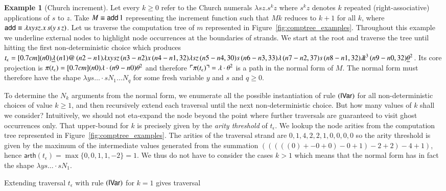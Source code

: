 \documentclass{elsarticle}
\theoremstyle{plain}
\theoremstyle{definition}
\newtheorem{example}{Example}[section]
\theoremstyle{remark}
\newcommand{\ghostlmd}{{\lambda\!\!\lambda}}
\newcommand{\ghostvar}{\theta}
\def\coresymbol{\pi} %
\newcommand{\core}[1]{\coresymbol(#1)} %
\newcommand\arth{\textsf{arth}} %
\newcommand{\alphaequiv}{\equiv}
\begin{document}
\begin{example}[Church increment]
\label{examp:churchincrement}
Let every $k\geq0$ refer to the Church numerals $\lambda s z . s^k z$
where $s^k z$ denotes $k$ repeated (right-associative) applications of $s$ to $z$.
Take $M \alphaequiv {\sf add}\, 1$ representing the increment function such that $M k$ reduces to $k+1$ for all $k$, where ${\sf add} \alphaequiv \lambda x y s z. x\, s (y\, s\, z)$.
Let us traverse the computation tree of $m$ represented in Figure~\ref{fig:comptree_examples}. Throughout this example we underline external nodes to highlight node occurrences at the boundaries of strands.
We start at the root and traverse the tree until hitting the first non-deterministic choice which produces
$t_\epsilon = \Pstr[0.7cm]{(n0){\underline\lambda }\,(n1){@}\,(n2-n1){\lambda x y s z}\,(n3-n2){x}\,(n4-n1,32){\lambda s z}\,(n5-n4,30){s}\,(n6-n3,33){\lambda }\,(n7-n2,37){s}\,(n8-n1,32){\ghostlmd^3}\,(n9-n0,32){\underline{\ghostvar}^2} }$. Its core projection is
$\core{t_\epsilon} = \Pstr[0.7cm]{(n0){\lambda} \cdot (n9-n0){{\ghostvar^2}} }$
and therefore $\pview{\core{t_\epsilon}} = \lambda\cdot \ghostvar^2$ is a path in the normal form of $M$.
The normal form must therefore have the shape $\lambda y s \ldots \cdot s N_1 \ldots N_q$ for some fresh variable $y$ and $s$ and $q\geq0$.

To determine the $N_k$ arguments from the normal form, we enumerate all the possible instantiation of rule $\mathbf{({\sf IVar})}$ for all non-deterministic choices of value $k\geq 1$, and then recursively extend each traversal until the next non-deterministic choice. But how many values of $k$ shall we consider? Intuitively, we should not eta-expand the node beyond the point where further traversals are guaranteed to visit ghost occurrences only. That upper-bound for $k$ is precisely given by the \emph{arity threshold} of $t_\epsilon$.
We lookup the node arities from the computation tree represented in Figure~\ref{fig:comptree_examples}. The arities of the traversal strand are
 $0,1,4,2,2,1,0,0,0,0$ so the arity threshold is given by the maximum of the intermediate values generated from the summation $(((((0) + -0+0) -0 +1) -2 + 2) -4 +1)$, hence $\arth(t_\epsilon) = \max \{ 0,0,1,1,-2 \} = 1$.
 We thus do not have to consider the cases $k>1$ which means that the normal form has in fact the shape $\lambda y s \ldots \cdot s N_1$.

Extending traversal $t_\epsilon$ with rule $\mathbf{({\sf IVar})}$ for $k=1$ gives traversal


\end{example}
\end{document}
